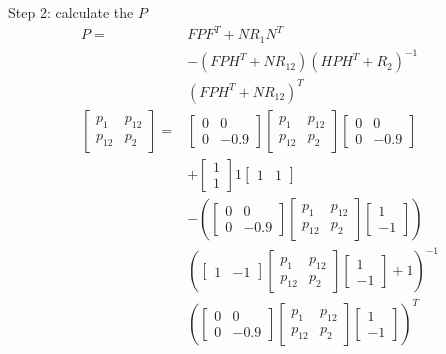 \begin{multicols}{2}
Step 2: calculate the $P$ 
\begin{align*}
    P = &FPF^T + NR_1N^T \\
    &-(FPH^T + NR_{12})(HPH^T+R_2)^{-1} \\
    &(FPH^T+NR_{12})^T \\
    \begin{bmatrix} p_{1} & p_{12} \\ p_{12} & p_{2} \end{bmatrix}
    = 
    &\begin{bmatrix} 0 & 0 \\ 0 & -0.9 \end{bmatrix}
    \begin{bmatrix} p_{1} & p_{12} \\ p_{12} & p_{2} \end{bmatrix}
    \begin{bmatrix} 0 & 0 \\ 0 & -0.9 \end{bmatrix}\\
    &+\begin{bmatrix} 1 \\ 1 \end{bmatrix}1
    \begin{bmatrix} 1 & 1 \end{bmatrix}\\
    &-\left(
    \begin{bmatrix} 0 & 0 \\ 0 & -0.9 \end{bmatrix}
    \begin{bmatrix} p_{1} & p_{12} \\ p_{12} & p_{2} \end{bmatrix}
    \begin{bmatrix} 1 \\ -1 \end{bmatrix}
    \right)\\
    &\left(
    \begin{bmatrix} 1 & -1 \end{bmatrix}
    \begin{bmatrix} p_{1} & p_{12} \\ p_{12} & p_{2} \end{bmatrix}
    \begin{bmatrix} 1 \\ -1 \end{bmatrix} +1
    \right)^{-1}\\
    &\left(
    \begin{bmatrix} 0 & 0 \\ 0 & -0.9 \end{bmatrix}
    \begin{bmatrix} p_{1} & p_{12} \\ p_{12} & p_{2} \end{bmatrix}
    \begin{bmatrix} 1 \\ -1 \end{bmatrix}
    \right)^T
\end{align*}


\end{multicols}
